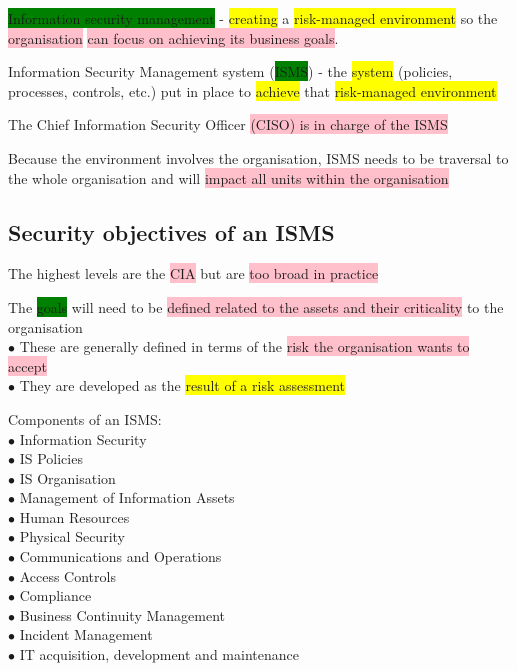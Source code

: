 \documentclass[tikz,border=10pt]{project_plan}
\newcommand{\bulletPoint}{\hspace{-3.1pt}$\bullet$ \hspace{5pt}}
\begin{document}
\colorbox{green}{Information security management} -
\colorbox{yellow}{creating} a \colorbox{yellow}{risk-managed environment} so the \colorbox{pink}{organisation} \colorbox{pink}{can focus on achieving its business goals}.

\newpage

Information Security Management system (\colorbox{green}{ISMS}) -
the \colorbox{yellow}{system} (policies, processes, controls, etc.) put in place to \colorbox{yellow}{achieve} that \colorbox{yellow}{risk-managed environment}

The Chief Information Security Officer \colorbox{pink}{(CISO) is in charge of the ISMS}

Because the environment involves the organisation, ISMS needs to be traversal to the whole organisation and will \colorbox{pink}{impact all units within the organisation}

\subsection{Security objectives of an ISMS}

The highest levels are the \colorbox{pink}{CIA} but are \colorbox{pink}{too broad in practice}

The \colorbox{green}{goals} will need to be \colorbox{pink}{defined related to the assets and their criticality} to the organisation\\
\bulletPoint These are generally defined in terms of the \colorbox{pink}{risk the organisation wants to accept}\\
\bulletPoint They are developed as the \colorbox{yellow}{result of a risk assessment}

Components of an ISMS:\\
\bulletPoint Information Security\\
\bulletPoint IS Policies\\
\bulletPoint IS Organisation\\
\bulletPoint Management of Information Assets\\
\bulletPoint Human Resources\\
\bulletPoint Physical Security\\
\bulletPoint Communications and Operations\\
\bulletPoint Access Controls\\
\bulletPoint Compliance\\
\bulletPoint Business Continuity Management\\
\bulletPoint Incident Management\\
\bulletPoint IT acquisition, development and maintenance
\end{document}
